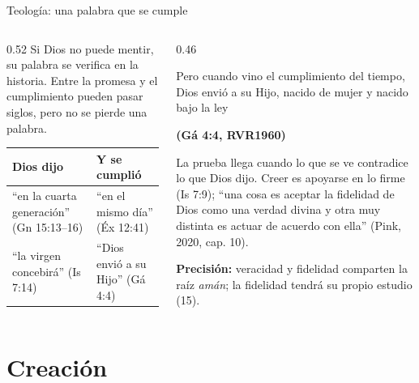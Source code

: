 \documentclass[hyperref={bookmarks=false},aspectratio=169]{beamer}
\newcommand{\fuente}[1]{\par\hfill{\upshape\bfseries\footnotesize\textcolor{azul}{#1}}}
\newcommand{\precision}[1]{{\footnotesize\color{gris}\textbf{Precisión:} #1}}
\begin{document}
\begin{frame}{Teología: una palabra que se cumple}
\begin{columns}[t,onlytextwidth]
\begin{column}{0.52\textwidth}\small
Si Dios no puede mentir, su palabra se verifica en la historia. Entre la promesa y el cumplimiento pueden pasar siglos, pero no se pierde una palabra.\par\medskip
\begin{tabular}{@{}>{\RaggedRight\arraybackslash}p{2.6cm}>{\RaggedRight\arraybackslash}p{3.2cm}@{}}
\toprule
\textbf{Dios dijo} & \textbf{Y se cumplió} \\ \midrule
``en la cuarta generación'' (Gn 15:13--16) & ``en el mismo día'' (Éx 12:41) \\
``la virgen concebirá'' (Is 7:14) & ``Dios envió a su Hijo'' (Gá 4:4) \\
\bottomrule
\end{tabular}
\end{column}
\begin{column}{0.46\textwidth}
\begin{cita}Pero cuando vino el cumplimiento del tiempo, Dios envió a su Hijo, nacido de mujer y nacido bajo la ley\fuente{(Gá 4:4, RVR1960)}\end{cita}
\small La prueba llega cuando lo que se ve contradice lo que Dios dijo. Creer es apoyarse en lo firme (Is 7:9); ``una cosa es aceptar la fidelidad de Dios como una verdad divina y otra muy distinta es actuar de acuerdo con ella'' (Pink, 2020, cap. 10).\par\smallskip
\precision{veracidad y fidelidad comparten la raíz \emph{amán}; la fidelidad tendrá su propio estudio (15).}
\end{column}
\end{columns}
\end{frame}

\section{Creación}
\end{document}
